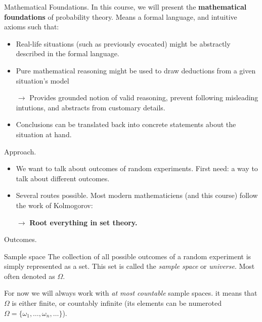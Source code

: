 \documentclass{beamer}
\begin{document}
\begin{frame}{Mathematical Foundations.}
  In this course, we will present the {\bf mathematical foundations} of probability theory. Means a formal language, and intuitive axioms such that:
 \begin{itemize}
  \item Real-life situations (such as previously evocated) might be abstractly described in the formal language.
  \item Pure mathematical reasoning might be used to draw deductions from a given situation's model
  \item[\alert{$\rightarrow$}] \alert{Provides grounded notion of valid reasoning, prevent following misleading intutions, and abstracts from customary details}.
  \item Conclusions can be translated back into concrete statements about the situation at hand.
  \end{itemize}
\end{frame}

\begin{frame}{Approach.}
  \begin{itemize}
  \item We want to talk about outcomes of random experiments. First need: a way to talk about different outcomes.
  \item Several routes possible. Most modern mathematiciens (and this course) follow the work of Kolmogorov:
  \item[$\rightarrow$]{\bf Root everything in set theory.}
  \end{itemize}
  
\end{frame}

\begin{frame}{Outcomes.}
  
  \begin{block}{Sample space}
    The collection of all possible outcomes of a random experiment is simply represented as a set. This set is called the \emph{sample space} or \emph{universe}. Most often denoted as $\Omega$.
  \end{block}

  For now we will always work with \emph{at most countable} sample spaces. {\color{blue} it means that $\Omega$ is either finite, or countably infinite (its elements can be numeroted $\Omega = \{ \omega_1, \dots, \omega_n, \dots\}$).}
\end{frame}
\end{document}
